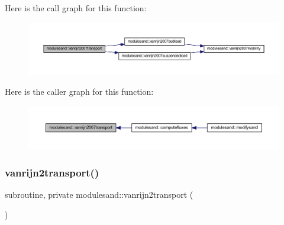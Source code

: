 Here is the call graph for this function\+:\nopagebreak
\begin{figure}[H]
\begin{center}
\leavevmode
\includegraphics[width=350pt]{namespacemodulesand_a86c23492690f1972adf61f7f2b36f027_cgraph}
\end{center}
\end{figure}
Here is the caller graph for this function\+:\nopagebreak
\begin{figure}[H]
\begin{center}
\leavevmode
\includegraphics[width=350pt]{namespacemodulesand_a86c23492690f1972adf61f7f2b36f027_icgraph}
\end{center}
\end{figure}
\mbox{\label{namespacemodulesand_afb5faaa6c12c4db3fe47e079018ed0f7}} 
\subsubsection{\texorpdfstring{vanrijn2transport()}{vanrijn2transport()}}
{\footnotesize\ttfamily subroutine, private modulesand\+::vanrijn2transport (\begin{DoxyParamCaption}{ }\end{DoxyParamCaption})\hspace{0.3cm}{\ttfamily [private]}}

